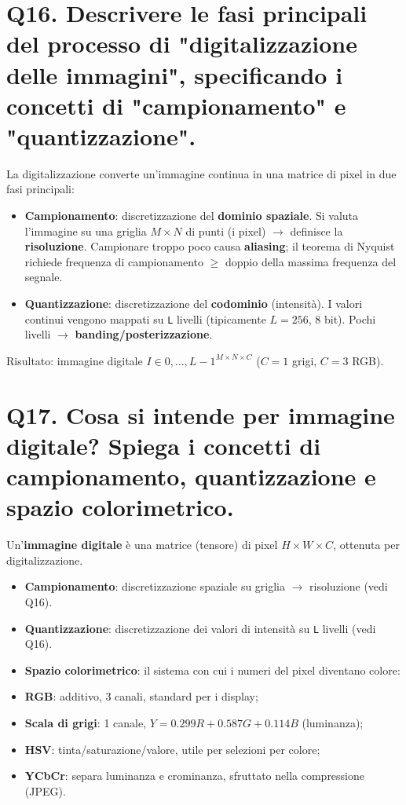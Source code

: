 \documentclass[11pt,a4paper]{article}
\begin{document}
\section*{Q16. Descrivere le fasi principali del processo di "digitalizzazione delle immagini", specificando i concetti di "campionamento" e "quantizzazione".}
La digitalizzazione converte un'immagine continua in una matrice di pixel in due fasi principali:
\begin{itemize}
\item \textbf{Campionamento}: discretizzazione del \textbf{dominio spaziale}. Si valuta l'immagine su una griglia $M\times N$ di punti (i pixel) $\to $ definisce la \textbf{risoluzione}. Campionare troppo poco causa \textbf{aliasing}; il teorema di Nyquist richiede frequenza di campionamento $\ge $ doppio della massima frequenza del segnale.
\item \textbf{Quantizzazione}: discretizzazione del \textbf{codominio} (intensità). I valori continui vengono mappati su \texttt{L} livelli (tipicamente $L=256$, 8 bit). Pochi livelli $\to $ \textbf{banding/posterizzazione}.
\end{itemize}
Risultato: immagine digitale $I \in  {0,\dots ,L-1}^{M\times N\times C}$ ($C=1$ grigi, $C=3$ RGB).
\newpage
\section*{Q17. Cosa si intende per immagine digitale? Spiega i concetti di campionamento, quantizzazione e spazio colorimetrico.}
Un'\textbf{immagine digitale} è una matrice (tensore) di pixel $H\times W\times C$, ottenuta per digitalizzazione.
\begin{itemize}
\item \textbf{Campionamento}: discretizzazione spaziale su griglia $\to $ risoluzione (vedi Q16).
\item \textbf{Quantizzazione}: discretizzazione dei valori di intensità su \texttt{L} livelli (vedi Q16).
\item \textbf{Spazio colorimetrico}: il sistema con cui i numeri del pixel diventano colore:
\item \textbf{RGB}: additivo, 3 canali, standard per i display;
\item \textbf{Scala di grigi}: 1 canale, $Y = 0.299R + 0.587G + 0.114B$ (luminanza);
\item \textbf{HSV}: tinta/saturazione/valore, utile per selezioni per colore;
\item \textbf{YCbCr}: separa luminanza e crominanza, sfruttato nella compressione (JPEG).
\end{itemize}
\newpage
\end{document}
